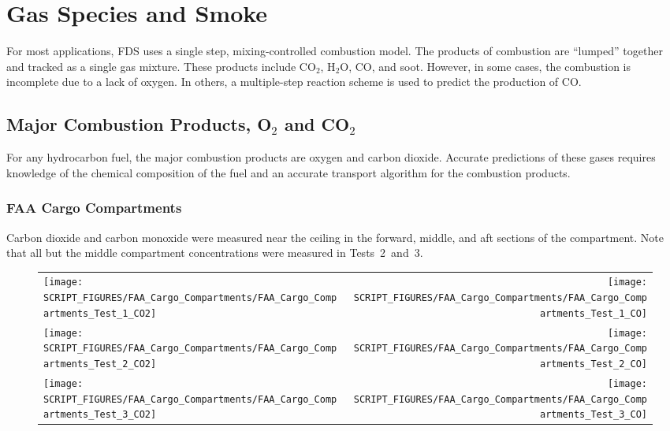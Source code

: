 
\chapter{Gas Species and Smoke}

For most applications, FDS uses a single step, mixing-controlled combustion model. The products of combustion are ``lumped'' together and tracked as a single gas mixture. These products include CO$_2$, H$_2$O, CO, and soot. However, in some cases, the combustion is incomplete due to a lack of oxygen. In others, a multiple-step reaction scheme is used to predict the production of CO.

\section{Major Combustion Products, O$_2$ and CO$_2$}

For any hydrocarbon fuel, the major combustion products are oxygen and carbon dioxide. Accurate predictions of these gases requires knowledge of the chemical composition of the fuel and an accurate transport algorithm for the combustion products.

\clearpage

\subsection{FAA Cargo Compartments}

Carbon dioxide and carbon monoxide were measured near the ceiling in the forward, middle, and aft sections of the compartment. Note that all but the middle compartment concentrations were measured in Tests~2~and~3.


\begin{figure}[h!]
\begin{tabular*}{\textwidth}{l@{\extracolsep{\fill}}r}
\texttt{[image: SCRIPT\_FIGURES/FAA\_Cargo\_Compartments/FAA\_Cargo\_Compartments\_Test\_1\_CO2]} &
\texttt{[image: SCRIPT\_FIGURES/FAA\_Cargo\_Compartments/FAA\_Cargo\_Compartments\_Test\_1\_CO]} \\
\texttt{[image: SCRIPT\_FIGURES/FAA\_Cargo\_Compartments/FAA\_Cargo\_Compartments\_Test\_2\_CO2]} &
\texttt{[image: SCRIPT\_FIGURES/FAA\_Cargo\_Compartments/FAA\_Cargo\_Compartments\_Test\_2\_CO]} \\
\texttt{[image: SCRIPT\_FIGURES/FAA\_Cargo\_Compartments/FAA\_Cargo\_Compartments\_Test\_3\_CO2]} &
\texttt{[image: SCRIPT\_FIGURES/FAA\_Cargo\_Compartments/FAA\_Cargo\_Compartments\_Test\_3\_CO]}
\end{tabular*}
\label{FAA_Cargo_CO2_CO}
\end{figure}

